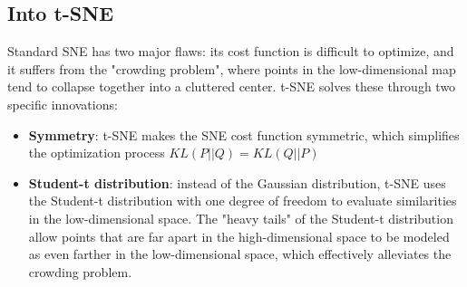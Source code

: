 \subsection{Into t-SNE}
Standard SNE has two major flaws: its cost function is difficult to optimize, and it suffers from the "crowding problem", where points in the low-dimensional map tend to collapse together into a cluttered center. t-SNE solves these through two specific innovations:
\begin{itemize}[noitemsep]
    \item \textbf{Symmetry}: t-SNE makes the SNE cost function symmetric, which simplifies the optimization process \(KL(P||Q) = KL (Q||P)\)
    \item \textbf{Student-t distribution}: instead of the Gaussian distribution, t-SNE uses the Student-t distribution with one degree of freedom to evaluate similarities in the low-dimensional space. The "heavy tails" of the Student-t distribution allow points that are far apart in the high-dimensional space to be modeled as even farther in the low-dimensional space, which effectively alleviates the crowding problem.
\end{itemize}